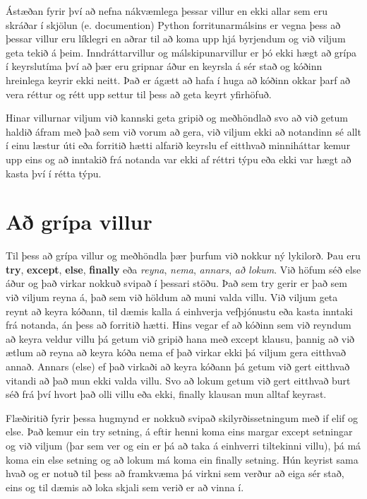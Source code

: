 Ástæðan fyrir því að nefna nákvæmlega þessar villur en ekki allar sem eru skráðar í skjölun (e. documention) Python forritunarmálsins er vegna þess að þessar villur eru líklegri en aðrar til að koma upp hjá byrjendum og við viljum geta tekið á þeim.
Inndráttarvillur og málskipunarvillur er þó ekki hægt að grípa í keyrslutíma því að þær eru gripnar áður en keyrsla á sér stað og kóðinn hreinlega keyrir ekki neitt.
Það er ágætt að hafa í huga að kóðinn okkar þarf að vera réttur og rétt upp settur til þess að geta keyrt yfirhöfuð.

Hinar villurnar viljum við kannski geta gripið og meðhöndlað svo að við getum haldið áfram með það sem við vorum að gera, við viljum ekki að notandinn sé allt í einu læstur úti eða forritið hætti alfarið keyrslu ef eitthvað minniháttar kemur upp eins og að inntakið frá notanda var ekki af réttri týpu eða ekki var hægt að kasta því í rétta týpu.

\section{Að grípa villur}\label{uk:villur-grípa}
Til þess að grípa villur og meðhöndla þær þurfum við nokkur ný lykilorð.
Þau eru \textbf{try}, \textbf{except}, \textbf{else}, \textbf{finally} eða \textit{reyna}, \textit{nema}, \textit{annars}, \textit{að lokum}.
Við höfum séð else áður og það virkar nokkuð svipað í þessari stöðu.
Það sem try gerir er það sem við viljum reyna á, það sem við höldum að muni valda villu.
Við viljum geta reynt að keyra kóðann, til dæmis kalla á einhverja vefþjónustu eða kasta inntaki frá notanda, án þess að forritið hætti.
Hins vegar ef að kóðinn sem við reyndum að keyra veldur villu þá getum við gripið hana með except klausu, þannig að við ætlum að reyna að keyra kóða nema ef það virkar ekki þá viljum gera eitthvað annað.
Annars (else) ef það virkaði að keyra kóðann þá getum við gert eitthvað vitandi að það mun ekki valda villu.
Svo að lokum getum við gert eitthvað burt séð frá því hvort það olli villu eða ekki, finally klausan mun alltaf keyrast.

Flæðiritið fyrir þessa hugmynd er nokkuð svipað skilyrðissetningum með if elif og else.
Það kemur ein try setning, á eftir henni koma eins margar except setningar og við viljum (þar sem ver og ein er þá að taka á einhverri tiltekinni villu), þá má koma ein else setning og að lokum má koma ein finally setning.
Hún keyrist sama hvað og er notuð til þess að framkvæma þá virkni sem verður að eiga sér stað, eins og til dæmis að loka skjali sem verið er að vinna í.

